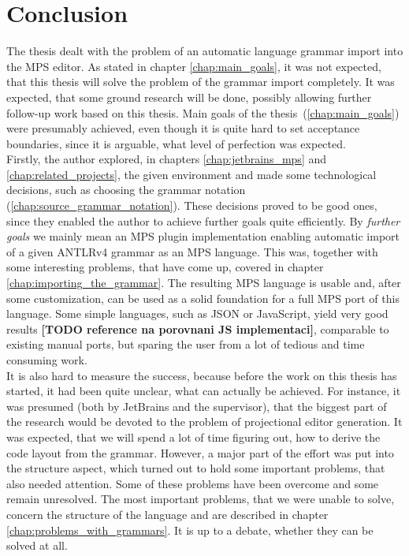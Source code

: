 \chapter{Conclusion}

The thesis dealt with the problem of an automatic language grammar import into the MPS editor.
As stated in chapter \ref{chap:main_goals}, it was not expected, that this thesis will solve the problem of the grammar import completely.
It was expected, that some ground research will be done, possibly allowing further follow-up work based on this thesis.
Main goals of the thesis~(\ref{chap:main_goals}) were presumably achieved, even though it is quite hard to set acceptance boundaries, since it is arguable, what level of perfection was expected.
\\

Firstly, the author explored, in chapters \ref{chap:jetbrains_mps} and \ref{chap:related_projects}, the given environment and made some technological decisions, such as choosing the grammar notation (\ref{chap:source_grammar_notation}).
These decisions proved to be good ones, since they enabled the author to achieve further goals quite efficiently.
By \textit{further goals} we mainly mean an MPS plugin implementation enabling automatic import of a given ANTLRv4 grammar as an MPS language. This was, together with some interesting problems, that have come up, covered in chapter \ref{chap:importing_the_grammar}.
The resulting MPS language is usable and, after some customization, can be used as a solid foundation for a full MPS port of this language.
Some simple languages, such as JSON or JavaScript, yield very good results\textbf{ [TODO reference na porovnani JS implementaci]}, comparable to existing manual ports, but sparing the user from a lot of tedious and time consuming work.
\\

It is also hard to measure the success, because before the work on this thesis has started, it had been quite unclear, what can actually be achieved.
For instance, it was presumed (both by JetBrains and the supervisor), that the biggest part of the research would be devoted to the problem of projectional editor generation.
It was expected, that we will spend a lot of time figuring out, how to derive the code layout from the grammar.
However, a major part of the effort was put into the structure aspect, which turned out to hold some important problems, that also needed attention.
Some of these problems have been overcome and some remain unresolved.
The most important problems, that we were unable to solve, concern the structure of the language and are described in chapter \ref{chap:problems_with_grammars}.
It is up to a debate, whether they can be solved at all.
\\

